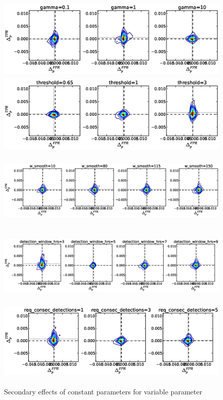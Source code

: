\begin{figure}[!h]
\begin{center}
\includegraphics[height=1.5in]{../fig/final/delta_hist_sec/cmpr_window/gamma}
\includegraphics[height=1.5in]{../fig/final/delta_hist_sec/cmpr_window/threshold}
\includegraphics[height=1.5in]{../fig/final/delta_hist_sec/cmpr_window/w_smooth}
\includegraphics[height=1.5in]{../fig/final/delta_hist_sec/cmpr_window/detection_window_hrs}
\includegraphics[height=1.5in]{../fig/final/delta_hist_sec/cmpr_window/req_consec_detections}
\end{center}
\caption{\label{fig:delta_sec2} Secondary effects of constant parameters for variable parameter }
\end{figure}

